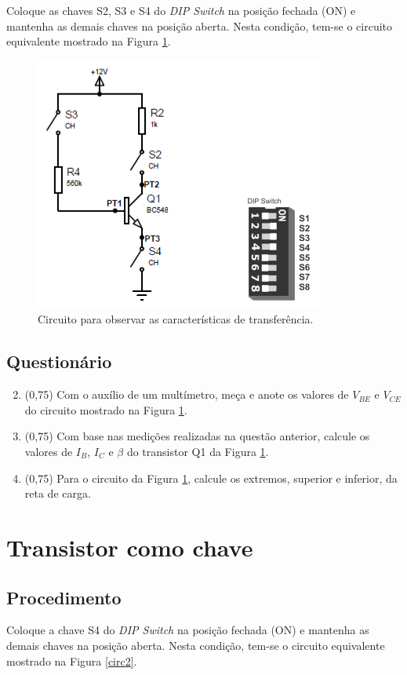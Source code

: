 \documentclass[11pt]{article}
\begin{document}
Coloque as chaves S2, S3 e S4 do \textit{DIP Switch} na posição fechada (ON) e mantenha as demais chaves na posição aberta. Nesta condição, tem-se o circuito equivalente mostrado na Figura \ref{circ1}.

\begin{figure}[!htb]
\centering
\includegraphics[width=.4\textwidth]{GanhoDC.png}
\caption{Circuito para observar as características de transferência.}
\label{circ1}
\end{figure}

\subsection*{Questionário}

\begin{enumerate}
\setcounter{enumi}{1}
\item (0,75) Com o auxílio de um multímetro, meça e anote os valores de $V_{BE}$ e $V_{CE}$ do circuito mostrado na Figura \ref{circ1}.

\item (0,75) Com base nas medições realizadas na questão anterior, calcule os valores de $I_B$, $I_C$ e $\beta$ do transistor Q1 da Figura \ref{circ1}.

\item (0,75) Para o circuito da Figura \ref{circ1}, calcule os extremos, superior e inferior, da reta de carga.
\end{enumerate}

\section*{Transistor como chave}

\subsection*{Procedimento}

Coloque a chave S4 do \textit{DIP Switch} na posição fechada (ON) e mantenha as demais chaves na posição aberta. Nesta condição, tem-se o circuito equivalente mostrado na Figura \ref{circ2}.
\end{document}
